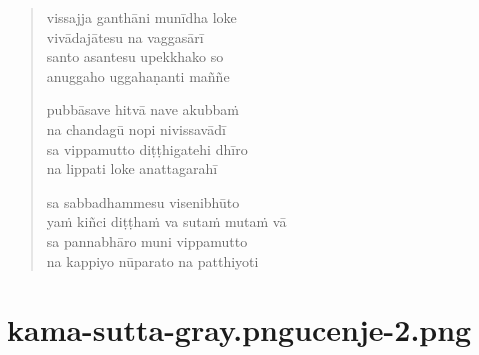 \begin{verse}
vissajja ganthāni munīdha loke\\
vivādajātesu na vaggasārī\\
santo asantesu upekkhako so\\
anuggaho uggahaṇanti maññe

pubbāsave hitvā nave akubbaṁ\\
na chandagū nopi nivissavādī\\
sa vippamutto diṭṭhigatehi dhīro\\
na lippati loke anattagarahī

sa sabbadhammesu visenibhūto\\
yaṁ kiñci diṭṭhaṁ va sutaṁ mutaṁ vā\\
sa pannabhāro muni vippamutto\\
na kappiyo nūparato na patthiyoti

\end{verse}


\chapter[Mahābyūha Sutta]{{kama-sutta-gray.png}{ucenje-2.png}}

